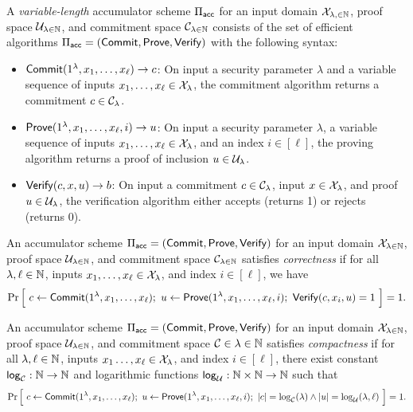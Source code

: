 \begin{definition}[Accumulator]
    A \emph{variable-length} accumulator scheme $\Pi_{\mathsf{acc}}$ for an input domain
    $\mathcal{X}_{\lambda, \in \mathbb{N}}$, proof space $\mathcal{U}_{\lambda \in \mathbb{N}}$, and commitment space
    $\mathcal{C}_{\lambda \in \mathbb{N}}$ consists of the set of efficient algorithms
    $\Pi_{\mathsf{acc}} = (\mathsf{Commit}, \mathsf{Prove},
    \allowbreak \mathsf{Verify})$ with the following syntax:
    \begin{itemize}
        \item $\mathsf{Commit}(1^\lambda, x_1, \ldots, x_\ell) \to c$: On input a
            security parameter $\lambda$ and a variable sequence of inputs
            $x_1, \ldots, x_\ell \in \mathcal{X}_\lambda$, the commitment algorithm
            returns a commitment $c \in \mathcal{C}_\lambda$.

        \item $\mathsf{Prove}(1^\lambda, x_1, \ldots, x_\ell, i) \to u$: On input a
            security parameter $\lambda$, a variable sequence of inputs $x_1,
            \ldots, x_\ell \in \mathcal{X}_\lambda$, and an index $i \in [\ell]$, the
            proving algorithm returns a proof of inclusion $u \in \mathcal{U}_\lambda$.

        \item $\mathsf{Verify}(c, x, u) \to b$: On input a commitment $c \in
            \mathcal{C}_\lambda$, input $x \in \mathcal{X}_\lambda$, and proof $u \in
            \mathcal{U}_\lambda$, the verification algorithm either accepts (returns
            1) or rejects (returns 0).
    \end{itemize}
\end{definition}

\begin{definition}[Correctness]
    An accumulator scheme $\Pi_{\mathsf{acc}} = (\mathsf{Commit}, \mathsf{Prove}, \mathsf{Verify})$ for an input
    domain $\mathcal{X}_{\lambda \in \mathbb{N}}$, proof space $\mathcal{U}_{\lambda \in \mathbb{N}}$, and
    commitment space $\mathcal{C}_{\lambda \in \mathbb{N}}$ satisfies \emph{correctness} if
    for all $\lambda, \ell \in \mathbb{N}$, inputs $x_1, \ldots, x_\ell \in
    \mathcal{X}_\lambda$, and index $i \in [\ell]$, we have
    \[ \Pr \Big[~ c \gets \mathsf{Commit}(1^\lambda, x_1, \ldots, x_\ell) ;~ u \gets
        \mathsf{Prove}(1^\lambda, x_1, \ldots, x_\ell, i) ;~ \mathsf{Verify}(c, x_i, u) = 1
        ~\Big] = 1 .\]
\end{definition}

\newcommand{\polylog}{\ms{polylog}}
\newcommand{\len}{\ms{len}}
\newcommand{\logg}{{\ms{log}}}

\begin{definition}[Compactness]
    An accumulator scheme $\Pi_{\mathsf{acc}} = (\mathsf{Commit}, \mathsf{Prove}, \mathsf{Verify})$ for an input
    domain $\mathcal{X}_{\lambda \in \mathbb{N}}$, proof space $\mathcal{U}_{\lambda \in \mathbb{N}}$, and
    commitment space $\mathcal{C} \in {\lambda \in \mathbb{N}}$ satisfies \emph{compactness}
    if for all $\lambda, \ell \in \mathbb{N}$, inputs $x_1 \ldots, x_\ell \in
    \mathcal{X}_\lambda$, and index $i \in [\ell]$, there exist constant $\logg_\calC:
    \N \to \N$ and logarithmic functions $\logg_{\calU}: \N \times \N \to \N$
    such that
    \[ \Pr \Big[~ c \gets \mathsf{Commit}(1^\lambda, x_1, \ldots, x_\ell) ;~ u \gets
        \mathsf{Prove}(1^\lambda, x_1, \ldots, x_\ell, i) ;~ |c| = \log_{\mathcal{C}}(\lambda) \land |u|
        = \log_{\mathcal{U}}(\lambda, \ell) ~\Big] = 1 .\]
\end{definition}

\begin{definition}[Soundness]
    
\end{definition}

